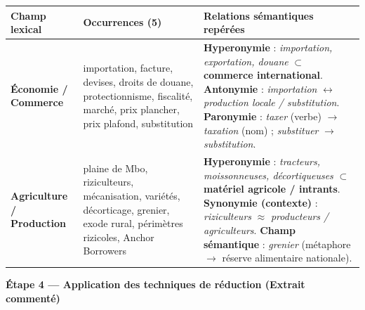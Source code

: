 \documentclass[11pt]{article}
\begin{document}
\begin{exoresolu}
\begin{center}
\begin{tabularx}{\linewidth}{|l|X|X|}\hline
\rowcolor{popblueL}
\textbf{Champ lexical} & \textbf{Occurrences (5)} & \textbf{Relations sémantiques repérées} \\ \hline
\cellcolor{popgreenL}\textbf{Économie / Commerce} & importation, facture, devises, droits de douane, protectionnisme, fiscalité, marché, prix plancher, prix plafond, substitution & \textbf{Hyperonymie} : \emph{importation, exportation, douane} $\subset$ \textbf{commerce international}. \textbf{Antonymie} : \emph{importation} $\leftrightarrow$ \emph{production locale / substitution}. \textbf{Paronymie} : \emph{taxer} (verbe) $\to$ \emph{taxation} (nom) ; \emph{substituer} $\to$ \emph{substitution}. \\ \hline
\cellcolor{poporangeL}\textbf{Agriculture / Production} & plaine de Mbo, riziculteurs, mécanisation, variétés, décorticage, grenier, exode rural, périmètres rizicoles, Anchor Borrowers & \textbf{Hyperonymie} : \emph{tracteurs, moissonneuses, décortiqueuses} $\subset$ \textbf{matériel agricole / intrants}. \textbf{Synonymie (contexte)} : \emph{riziculteurs} $\approx$ \emph{producteurs / agriculteurs}. \textbf{Champ sémantique} : \emph{grenier} (métaphore $\to$ réserve alimentaire nationale). \\ \hline
\end{tabularx}
\end{center}

\textbf{Étape 4 — Application des techniques de réduction (Extrait commenté)}


\end{exoresolu}
\end{document}
